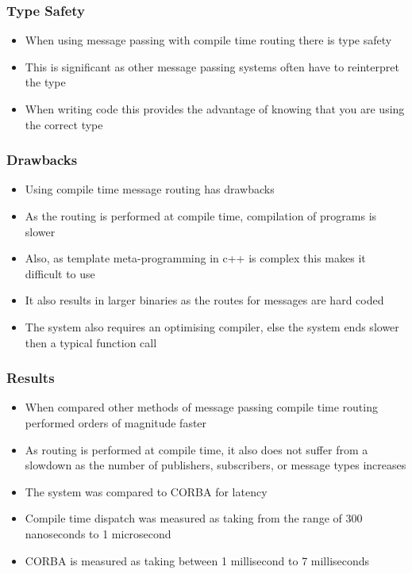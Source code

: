 \documentclass{beamer}
\begin{document}
	\begin{frame}
		\frametitle{Type Safety}
		\begin{itemize}
			\item When using message passing with compile time routing there is type safety
			\item This is significant as other message passing systems often have to reinterpret the type
			\item When writing code this provides the advantage of knowing that you are using the correct type
		\end{itemize}
	\end{frame}

	\begin{frame}
		\frametitle{Drawbacks}
		\begin{itemize}
			\item Using compile time message routing has drawbacks
			\item As the routing is performed at compile time, compilation of programs is slower
			\item Also, as template meta-programming in c++ is complex this makes it difficult to use
			\item It also results in larger binaries as the routes for messages are hard coded
			\item The system also requires an optimising compiler, else the system ends slower then a typical function call
		\end{itemize}
	\end{frame}

	\begin{frame}
		\frametitle{Results}
		\begin{itemize}
			\item When compared other methods of message passing compile time routing performed orders of magnitude faster
			\item As routing is performed at compile time, it also does not suffer from a slowdown as the number of publishers, subscribers, or message types increases
			\item The system was compared to CORBA for latency
			\item Compile time dispatch was measured as taking from the range of 300 nanoseconds to 1 microsecond
			\item CORBA is measured as taking between 1 millisecond to 7 milliseconds
		\end{itemize}
	\end{frame}
\end{document}
